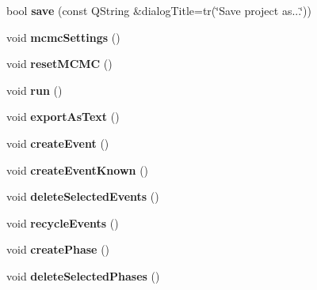 \begin{DoxyCompactItemize}
\item 
\hypertarget{class_project_afd74ee4e0eb22193311bb16c32b9e108}{bool {\bfseries save} (const Q\-String \&dialog\-Title=tr(\char`\"{}Save project as...\char`\"{}))}\label{class_project_afd74ee4e0eb22193311bb16c32b9e108}

\item 
\hypertarget{class_project_a67300294b5149e808f0bc1b301602d1e}{void {\bfseries mcmc\-Settings} ()}\label{class_project_a67300294b5149e808f0bc1b301602d1e}

\item 
\hypertarget{class_project_aadaca973d47dac1cb39e8939e672d087}{void {\bfseries reset\-M\-C\-M\-C} ()}\label{class_project_aadaca973d47dac1cb39e8939e672d087}

\item 
\hypertarget{class_project_a1e0621d312f25aa93880ceb24a6d6b8a}{void {\bfseries run} ()}\label{class_project_a1e0621d312f25aa93880ceb24a6d6b8a}

\item 
\hypertarget{class_project_ab697a7d08494cd973531b2b7674dfd1c}{void {\bfseries export\-As\-Text} ()}\label{class_project_ab697a7d08494cd973531b2b7674dfd1c}

\item 
\hypertarget{class_project_acc73bfe1e3528d107a40d02d91d4df9f}{void {\bfseries create\-Event} ()}\label{class_project_acc73bfe1e3528d107a40d02d91d4df9f}

\item 
\hypertarget{class_project_a39406ad6596d0b4d9cef2b5d16428408}{void {\bfseries create\-Event\-Known} ()}\label{class_project_a39406ad6596d0b4d9cef2b5d16428408}

\item 
\hypertarget{class_project_ab33230d72f9eee563696c46e1d4061ab}{void {\bfseries delete\-Selected\-Events} ()}\label{class_project_ab33230d72f9eee563696c46e1d4061ab}

\item 
\hypertarget{class_project_a02a8c65816238944c495d91be4e7e418}{void {\bfseries recycle\-Events} ()}\label{class_project_a02a8c65816238944c495d91be4e7e418}

\item 
\hypertarget{class_project_a28875eb695bc6fe4f96c3c6a5dc56788}{void {\bfseries create\-Phase} ()}\label{class_project_a28875eb695bc6fe4f96c3c6a5dc56788}

\item 
\hypertarget{class_project_aa07918f7213d104bc5b8c56bc85cb003}{void {\bfseries delete\-Selected\-Phases} ()}\label{class_project_aa07918f7213d104bc5b8c56bc85cb003}

\end{DoxyCompactItemize}
